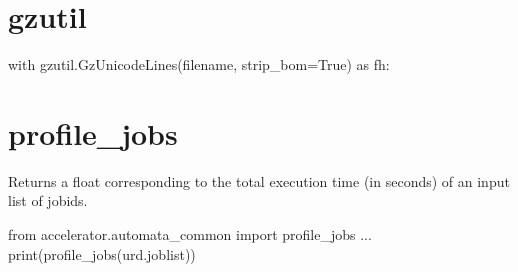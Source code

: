 \section{gzutil}
\begin{python}
with gzutil.GzUnicodeLines(filename, strip_bom=True) as fh:
\end{python}



\section{profile\_jobs}
Returns a float corresponding to the total execution time (in seconds)
of an input list of jobids.
\begin{python}
from accelerator.automata_common import profile_jobs
...
print(profile_jobs(urd.joblist))
\end{python}
